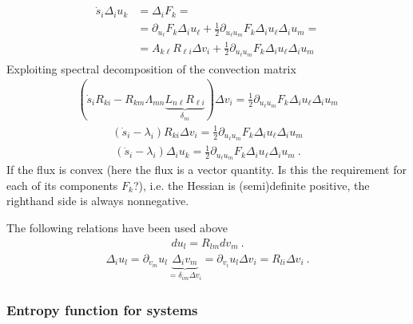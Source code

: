 \documentclass[letterpaper,10pt,english]{jupyterBook}
\begin{document}
\begin{equation*}
\begin{split}\begin{aligned}
 \dot{s}_i \Delta_i u_k 
 & = \Delta_i F_k = \\
 & = \partial_{u_\ell} F_k \Delta_i u_\ell + \frac{1}{2} \partial_{u_\ell u_m} F_k \Delta_i u_{\ell} \Delta_i u_{m} = \\
 & = A_{k \ell} R_{\ell i} \Delta v_i + \frac{1}{2} \partial_{u_\ell u_m} F_k \Delta_i u_{\ell} \Delta_i u_{m} 
\end{aligned}\end{split}
\end{equation*}
\sphinxAtStartPar
Exploiting spectral decomposition of the convection matrix
\begin{equation*}
\begin{split}\left( \dot{s}_i R_{ki} - R_{km} \Lambda_{mn} \underbrace{L_{n\ell} R_{\ell i}}_{\delta_{ni}} \right) \Delta v_i = \frac{1}{2} \partial_{u_\ell u_m} F_k \Delta_i u_\ell \Delta_i u_m\end{split}
\end{equation*}\begin{equation*}
\begin{split}\left( \dot{s}_i - \lambda_i \right) R_{ki}\Delta v_i = \frac{1}{2} \partial_{u_\ell u_m} F_k \Delta_i u_\ell \Delta_i u_m\end{split}
\end{equation*}\begin{equation*}
\begin{split}\left( \dot{s}_i - \lambda_i \right) \Delta_i u_k = \frac{1}{2} \partial_{u_\ell u_m} F_k \Delta_i u_\ell \Delta_i u_m \ .\end{split}
\end{equation*}
\sphinxAtStartPar
If the flux is convex (here the flux is a vector quantity. Is this the requirement for each of its components \(F_k\)?), i.e. the Hessian is (semi)definite positive, the right\sphinxhyphen{}hand side is always non\sphinxhyphen{}negative.

\sphinxAtStartPar
The following relations have been used above
\begin{equation*}
\begin{split}d u_l = R_{lm} d v_m \ .\end{split}
\end{equation*}\begin{equation*}
\begin{split}\Delta_i u_l = \partial_{v_m} u_l \underbrace{\Delta_i v_m}_{= \delta_{im} \Delta v_i} = \partial_{v_i} u_l \Delta v_i = R_{li} \Delta v_i \ .\end{split}
\end{equation*}\subsubsection*{Entropy function for systems}
\end{document}
